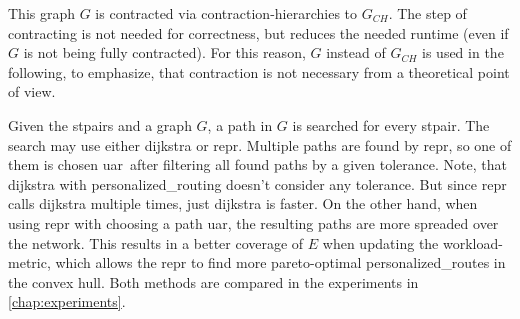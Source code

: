         This graph $G$ is contracted via \gls{contraction-hierarchies} to $G_{CH}$.
        The step of contracting is not needed for correctness, but reduces the needed runtime (even if $G$ is not being fully contracted).
        For this reason, $G$ instead of $G_{CH}$ is used in the following, to emphasize, that contraction is not necessary from a theoretical point of view.

        Given the \glspl{stpair} and a graph $G$, a path in $G$ is searched for every \gls{stpair}.
        The search may use either \gls{dijkstra} or \gls{repr}.
        Multiple paths are found by \gls{repr}, so one of them is chosen \gls{uar}\ after filtering all found paths by a given tolerance.
        Note, that \gls{dijkstra} with \gls{personalized_routing} doesn't consider any tolerance.
        But since \gls{repr} calls \gls{dijkstra} multiple times, just \gls{dijkstra} is faster.
        On the other hand, when using \gls{repr} with choosing a path \gls{uar}, the resulting paths are more spreaded over the network.
        This results in a better coverage of $E$ when updating the workload-\gls{metric}, which allows the \gls{repr} to find more pareto-optimal \glspl{personalized_route} in the convex hull.
        Both methods are compared in the experiments in \vref{chap:experiments}.

